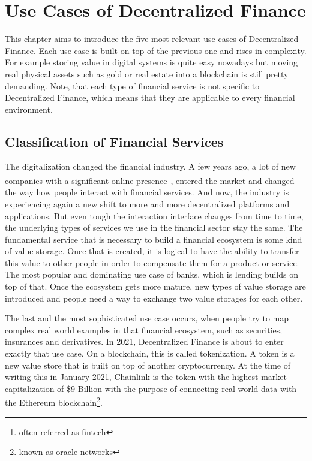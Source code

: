 \chapter{Use Cases of Decentralized Finance}
\label{cha:UseCasesDecentralizedFinance}

This chapter aims to introduce the five most relevant use cases of Decentralized Finance. Each use case is built on top of the previous one and rises in complexity. For example storing value in digital systems is quite easy nowadays but moving real physical assets such as gold or real estate into a blockchain is still pretty demanding. Note, that each type of financial service is not specific to Decentralized Finance, which means that they are applicable to every financial environment.

\section{Classification of Financial Services}
The digitalization changed the financial industry. A few years ago, a lot of new companies with a significant online presence\footnote{often referred as fintech}, entered the market and changed the way how people interact with financial services. And now, the industry is experiencing again a new shift to more and more decentralized platforms and applications. But even tough the interaction interface changes from time to time, the underlying types of services we use in the financial sector stay the same. The fundamental service that is necessary to build a financial ecosystem is some kind of value storage. Once that is created, it is logical to have the ability to transfer this value to other people in order to compensate them for a product or service. The most popular and dominating use case of banks, which is lending builds on top of that. Once the ecosystem gets more mature, new types of value storage are introduced and people need a way to exchange two value storages for each other.

The last and the most sophisticated use case occurs, when people try to map complex real world examples in that financial ecosystem, such as securities, insurances and derivatives. In 2021, Decentralized Finance is about to enter exactly that use case. On a blockchain, this is called tokenization. A token is a new value store that is built on top of another cryptocurrency. At the time of writing this in January 2021, Chainlink\cite{Chainlink} is the token with the highest market capitalization of \$9 Billion\cite{CoinMarketCap2021} with the purpose of connecting real world data with the Ethereum blockchain\footnote{known as oracle networks}.

